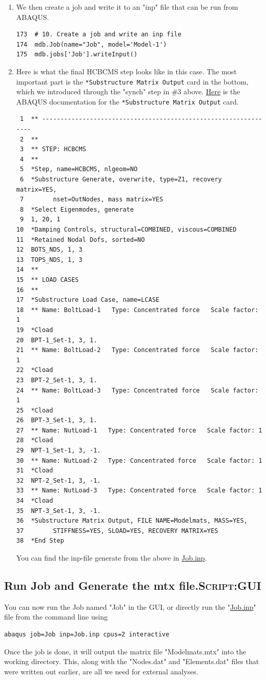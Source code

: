 \documentclass[11pt]{article}
\begin{document}
\begin{enumerate}
\item We then create a job and write it to an "inp" file that can be run from ABAQUS.
\begin{verbatim}
173  # 10. Create a job and write an inp file
174  mdb.Job(name="Job", model='Model-1')
175  mdb.jobs['Job'].writeInput()
\end{verbatim}
\item Here is what the final HCBCMS step looks like in this case.
The most important part is the \texttt{*Substructure Matrix Output} card in the bottom,
which we introduced through the "synch" step in \#3 above.
\href{https://classes.engineering.wustl.edu/2009/spring/mase5513/abaqus/docs/v6.6/books/key/default.htm?startat=ch18abk43.html}{Here} is the ABAQUS documentation for the \texttt{*Substructure Matrix Output} card.
\begin{verbatim}
 1  ** ----------------------------------------------------------------
 2  ** 
 3  ** STEP: HCBCMS
 4  ** 
 5  *Step, name=HCBCMS, nlgeom=NO
 6  *Substructure Generate, overwrite, type=Z1, recovery matrix=YES,
 7        nset=OutNodes, mass matrix=YES
 8  *Select Eigenmodes, generate
 9  1, 20, 1
10  *Damping Controls, structural=COMBINED, viscous=COMBINED
11  *Retained Nodal Dofs, sorted=NO
12  BOTS_NDS, 1, 3
13  TOPS_NDS, 1, 3
14  ** 
15  ** LOAD CASES
16  ** 
17  *Substructure Load Case, name=LCASE
18  ** Name: BoltLoad-1   Type: Concentrated force   Scale factor: 1
19  *Cload
20  BPT-1_Set-1, 3, 1.
21  ** Name: BoltLoad-2   Type: Concentrated force   Scale factor: 1
22  *Cload
23  BPT-2_Set-1, 3, 1.
24  ** Name: BoltLoad-3   Type: Concentrated force   Scale factor: 1
25  *Cload
26  BPT-3_Set-1, 3, 1.
27  ** Name: NutLoad-1   Type: Concentrated force   Scale factor: 1
28  *Cload
29  NPT-1_Set-1, 3, -1.
30  ** Name: NutLoad-2   Type: Concentrated force   Scale factor: 1
31  *Cload
32  NPT-2_Set-1, 3, -1.
33  ** Name: NutLoad-3   Type: Concentrated force   Scale factor: 1
34  *Cload
35  NPT-3_Set-1, 3, -1.
36  *Substructure Matrix Output, FILE NAME=Modelmats, MASS=YES,
37        STIFFNESS=YES, SLOAD=YES, RECOVERY MATRIX=YES
38  *End Step
\end{verbatim}
You can find the inp-file generate from the above in \href{https://github.com/Nidish96/Abaqus4Joints/blob/main/assets/demo/Job.inp}{Job.inp}.
\end{enumerate}
\subsection{Run Job and Generate the mtx file.\hfill{}\textsc{Script:GUI}}
\label{sec:org6f5f4d3}
You can now run the Job named "Job" in the GUI, or directly run the "\href{https://github.com/Nidish96/Abaqus4Joints/blob/main/assets/demo/Job.inp}{Job.inp}" file from the command line using
\begin{verbatim}
abaqus job=Job inp=Job.inp cpus=2 interactive
\end{verbatim}
Once the job is done, it will output the matrix file "Modelmats.mtx" into the working directory.
This, along with the "Nodes.dat" and "Elements.dat" files that were written out earlier, are all we need for external analyses.
\end{document}
